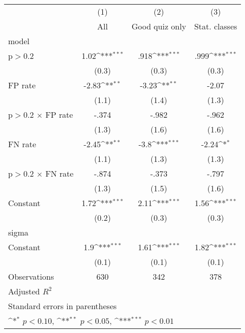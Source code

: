 {
\def\sym#1{\ifmmode^{#1}\else\(^{#1}\)\fi}
\begin{tabular}{l*{3}{c}}
\hline\hline
                &\multicolumn{1}{c}{(1)}&\multicolumn{1}{c}{(2)}&\multicolumn{1}{c}{(3)}\\
                &\multicolumn{1}{c}{All}&\multicolumn{1}{c}{Good quiz only}&\multicolumn{1}{c}{Stat. classes}\\
\hline
model           &                  &                  &                  \\
p$>$0.2         &     1.02\sym{***}&     .918\sym{***}&     .999\sym{***}\\
                &    (0.3)         &    (0.3)         &    (0.3)         \\
FP rate         &    -2.83\sym{**} &    -3.23\sym{**} &    -2.07         \\
                &    (1.1)         &    (1.4)         &    (1.3)         \\
p$>$0.2 $\times$ FP rate&    -.374         &    -.982         &    -.962         \\
                &    (1.3)         &    (1.6)         &    (1.6)         \\
FN rate         &    -2.45\sym{**} &     -3.8\sym{***}&    -2.24\sym{*}  \\
                &    (1.1)         &    (1.3)         &    (1.3)         \\
p$>$0.2 $\times$ FN rate&    -.874         &    -.373         &    -.797         \\
                &    (1.3)         &    (1.5)         &    (1.6)         \\
Constant        &     1.72\sym{***}&     2.11\sym{***}&     1.56\sym{***}\\
                &    (0.2)         &    (0.3)         &    (0.3)         \\
\hline
sigma           &                  &                  &                  \\
Constant        &      1.9\sym{***}&     1.61\sym{***}&     1.82\sym{***}\\
                &    (0.1)         &    (0.1)         &    (0.1)         \\
\hline
Observations    &      630         &      342         &      378         \\
Adjusted \(R^{2}\)&                  &                  &                  \\
\hline\hline
\multicolumn{4}{l}{\footnotesize Standard errors in parentheses}\\
\multicolumn{4}{l}{\footnotesize \sym{*} \(p<0.10\), \sym{**} \(p<0.05\), \sym{***} \(p<0.01\)}\\
\end{tabular}
}
